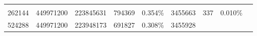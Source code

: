 \documentclass[11pt]{article}
\begin{document}
\begin{longtable}[]{@{}lllllllll@{}}
\begin{minipage}[t]{0.06\columnwidth}
\strut
\end{minipage}\tabularnewline
\begin{minipage}[t]{0.12\columnwidth}\raggedright\strut
262144\strut
\end{minipage} & \begin{minipage}[t]{0.09\columnwidth}\raggedright\strut
449971200\strut
\end{minipage} & \begin{minipage}[t]{0.07\columnwidth}\raggedright\strut
223845631\strut
\end{minipage} & \begin{minipage}[t]{0.08\columnwidth}\raggedright\strut
794369\strut
\end{minipage} & \begin{minipage}[t]{0.08\columnwidth}\raggedright\strut
0.354\%\strut
\end{minipage} & \begin{minipage}[t]{0.08\columnwidth}\raggedright\strut
3455663\strut
\end{minipage} & \begin{minipage}[t]{0.09\columnwidth}\raggedright\strut
337\strut
\end{minipage} & \begin{minipage}[t]{0.09\columnwidth}\raggedright\strut
0.010\%\strut
\end{minipage} & \begin{minipage}[t]{0.06\columnwidth}\raggedright\strut
\strut
\end{minipage}\tabularnewline
\begin{minipage}[t]{0.12\columnwidth}\raggedright\strut
524288\strut
\end{minipage} & \begin{minipage}[t]{0.09\columnwidth}\raggedright\strut
449971200\strut
\end{minipage} & \begin{minipage}[t]{0.07\columnwidth}\raggedright\strut
223948173\strut
\end{minipage} & \begin{minipage}[t]{0.08\columnwidth}\raggedright\strut
691827\strut
\end{minipage} & \begin{minipage}[t]{0.08\columnwidth}\raggedright\strut
0.308\%\strut
\end{minipage} & \begin{minipage}[t]{0.08\columnwidth}\raggedright\strut
3455928\strut
\end{minipage} & \begin{minipage}[t]{0.09\columnwidth}\raggedright\strut

\end{minipage}
\end{longtable}
\end{document}
